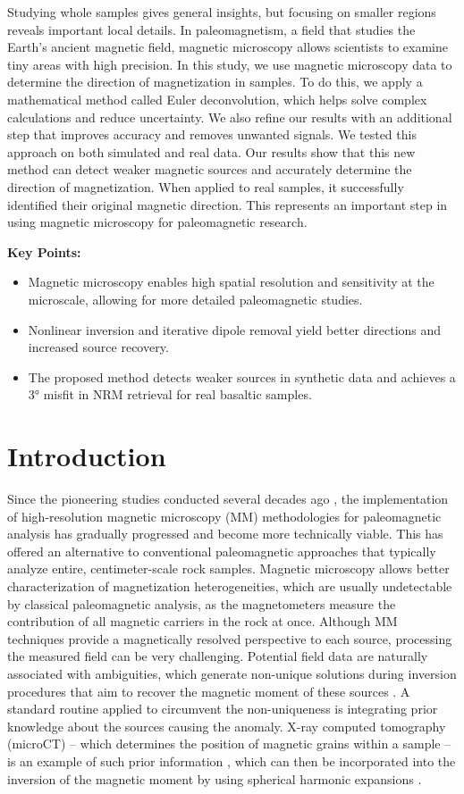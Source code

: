 \documentclass[onecolumn,12pt,a4paper]{article}
\newcommand{\Keywords}{%
  paleomagnetism; magnetic microscopy;
}
\newcommand{\KeyPoints}{%
\begin{itemize}
    \item Magnetic microscopy enables high spatial resolution and sensitivity at the microscale, allowing for more detailed paleomagnetic studies.
    \item Nonlinear inversion and iterative dipole removal yield better directions and increased source recovery.
    \item The proposed method detects weaker sources in synthetic data and achieves a 3° misfit in NRM retrieval for real basaltic samples.
\end{itemize}
}
\begin{document}
Studying whole samples gives general insights, but focusing on smaller regions reveals important local details. In paleomagnetism, a field that studies the Earth's ancient magnetic field, magnetic microscopy allows scientists to examine tiny areas with high precision. In this study, we use magnetic microscopy data to determine the direction of magnetization in samples. To do this, we apply a mathematical method called Euler deconvolution, which helps solve complex calculations and reduce uncertainty. We also refine our results with an additional step that improves accuracy and removes unwanted signals. We tested this approach on both simulated and real data. Our results show that this new method can detect weaker magnetic sources and accurately determine the direction of magnetization. When applied to real samples, it successfully identified their original magnetic direction. This represents an important step in using magnetic microscopy for paleomagnetic research.

\vspace{0.5cm}
\noindent
\textbf{Key Points:} \KeyPoints{}

\section{Introduction}

Since the pioneering studies conducted several decades ago \citep[\textit{e.g.,}][]{Thomas1992, Egli2000}, the implementation of high-resolution magnetic microscopy (MM) methodologies for paleomagnetic analysis has gradually progressed and become more technically viable. This has offered an alternative to conventional paleomagnetic approaches that typically analyze entire, centimeter-scale rock samples. Magnetic microscopy allows better characterization of magnetization heterogeneities, which are usually undetectable by classical paleomagnetic analysis, as the magnetometers measure the contribution of all magnetic carriers in the rock at once. Although MM techniques provide a magnetically resolved perspective to each source, processing the measured field can be very challenging. Potential field data are naturally associated with ambiguities, which generate non-unique solutions during inversion procedures that aim to recover the magnetic moment of these sources \citep{Blakely1996}. A standard routine applied to circumvent the non-uniqueness is integrating prior knowledge about the sources causing the anomaly. X-ray computed tomography (microCT) -- which determines the position of magnetic grains within a sample \citep{Fabian2019} -- is an example of such prior information \citep[\textit{e.g.}][]{DeGroot2018, DeGroot2021, Koster2023}, which can then be incorporated into the inversion of the magnetic moment by using spherical harmonic expansions \citep[\textit{e.g.}][]{CortesOrtuno2021, CortesOrtuno2022}.
\end{document}
